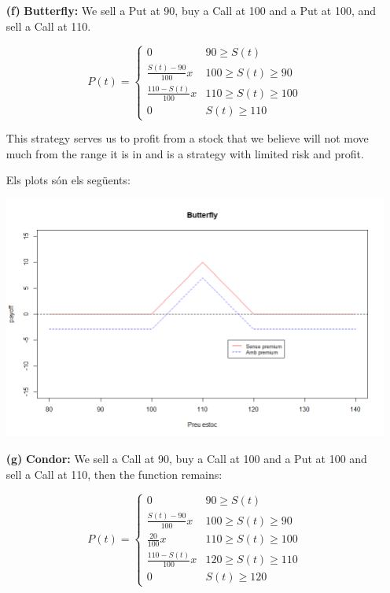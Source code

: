 \documentclass[a4paper,]{article}
\begin{document}
\begin{itemize}
    \item[\textbf{(f)}] \textbf{Butterfly:} We sell a Put at 90, buy a Call at 100 and a Put at 100, and sell a Call at 110.

    \[ 
    P(t)=
    \begin{cases}
        0 & 90\geq S(t) \\
        \frac{S(t)-90}{100}x & 100\geq S(t)\geq 90 \\
        \frac{110-S(t)}{100}x & 110\geq S(t)\geq 100 \\
        0 & S(t)\geq 110
    \end{cases}
    \]

    This strategy serves us to profit from a stock that we believe will not move much from the range it is in and is a strategy with limited risk and profit.

    \vspace{3mm}
    \noindent
    Els plots són els següents:

    \includegraphics[scale=0.5]{Butterfly.png}

    \item[\textbf{(g)}] \textbf{Condor:} We sell a Call at 90, buy a Call at 100 and a Put at 100 and sell a Call at 110, then the function remains:

    \[ 
    P(t)=
    \begin{cases}
        0 & 90\geq S(t) \\
        \frac{S(t)-90}{100}x & 100\geq S(t)\geq 90 \\
        \frac{20}{100}x & 110\geq S(t)\geq 100 \\
        \frac{110-S(t)}{100}x & 120\geq S(t)\geq 110 \\
        0 & S(t)\geq 120
    \end{cases}
    \]


\end{itemize}
\end{document}
